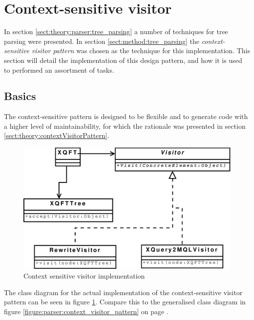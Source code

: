 \section{Context-sensitive visitor}
\label{sect:impl:context_sens_visitor}
In section \ref{sect:theory:parser:tree_parsing} a number of techniques for
tree parsing were presented. In section \ref{sect:method:tree_parsing} the
\textit{context-sensitive visitor pattern} was chosen as the technique for this
implementation. This section will detail the implementation of this design
pattern, and how it is used to performed an assortment of tasks.

\subsection{Basics}
The context-sensitive pattern is designed to be flexible and to generate code
with a higher level of maintainability, for which the rationale was presented
in section \ref{sect:theory:contextVisitorPattern}. 

\begin{figure}[htp]
\begin{center}
  \includegraphics[scale=0.5]{diagrams/context_visitor_pattern_impl}
  \caption{Context sensitive visitor implementation}
  \label{fig:impl:context_sens_visitor_impl}
\end{center}
\end{figure}

The class diagram for the actual implementation of the context-sensitive
visitor pattern can be seen in figure \ref{fig:impl:context_sens_visitor_impl}.
Compare this to the generalised class diagram in figure
\ref{figure:parser:context_visitor_pattern} on page
\pageref{figure:parser:context_visitor_pattern}.

